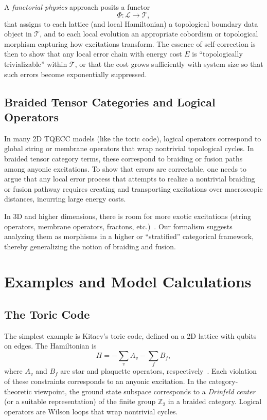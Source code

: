 \documentclass[12pt]{article}
\begin{document}
A \emph{functorial physics} approach posits a functor
\[
\Phi : \mathcal{L} \longrightarrow \mathcal{T},
\]
that assigns to each lattice (and local Hamiltonian) a topological boundary data object in $\mathcal{T}$, and to each local evolution an appropriate cobordism or topological morphism capturing how excitations transform. The essence of self-correction is then to show that any local error chain with energy cost $E$ is “topologically trivializable” within $\mathcal{T}$, or that the cost grows sufficiently with system size so that such errors become exponentially suppressed.

\subsection{Braided Tensor Categories and Logical Operators}
In many 2D TQECC models (like the toric code), logical operators correspond to global string or membrane operators that wrap nontrivial topological cycles. In braided tensor category terms, these correspond to braiding or fusion paths among anyonic excitations. To show that errors are correctable, one needs to argue that any local error process that attempts to realize a nontrivial braiding or fusion pathway requires creating and transporting excitations over macroscopic distances, incurring large energy costs.

In 3D and higher dimensions, there is room for more exotic excitations (string operators, membrane operators, fractons, etc.)~\cite{haah2011local, vijay2016fracton}. Our formalism suggests analyzing them as morphisms in a higher or “stratified” categorical framework, thereby generalizing the notion of braiding and fusion.

\section{Examples and Model Calculations}
\subsection{The Toric Code}
The simplest example is Kitaev’s toric code, defined on a 2D lattice with qubits on edges. The Hamiltonian is
\[
H = -\sum_{v} A_v - \sum_{f} B_f,
\]
where $A_v$ and $B_f$ are star and plaquette operators, respectively~\cite{kitaev2003fault}. Each violation of these constraints corresponds to an anyonic excitation. In the category-theoretic viewpoint, the ground state subspace corresponds to a \emph{Drinfeld center} (or a suitable representation) of the finite group $\mathbb{Z}_2$ in a braided category. Logical operators are Wilson loops that wrap nontrivial cycles.
\end{document}
